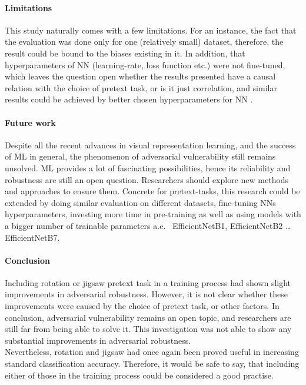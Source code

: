 \paragraph{Limitations}This study naturally comes with a few limitations.
For an instance, the fact that the evaluation was done only for one (relatively small) dataset,
therefore, the result could be bound to the biases existing in it.
In addition, that hyperparameters of NN (learning-rate, loss function etc.)
were not fine-tuned, which leaves the question open whether the
results presented have a causal relation with the choice of pretext task, or is it just correlation,
and similar results could be achieved by better chosen hyperparameters for NN .

\paragraph{Future work}
Despite all the recent advances in visual representation learning, and the success of ML in general, the phenomenon of
adversarial vulnerability still remains unsolved.
ML provides a lot of fascinating possibilities, hence its reliability and robustness are still an open question.
Researchers should explore new methods and approaches to ensure them.
Concrete for pretext-tasks, this research could be extended by doing similar evaluation on different datasets,
fine-tuning NNs hyperparameters,
investing more time in pre-training as well as using models with a bigger number of trainable parameters
a.e. \ EfficientNetB1, EfficientNetB2 \ldots EfficientNetB7.

\paragraph{Conclusion}
Including rotation or jigsaw pretext task in a training process had shown slight improvements in adversarial robustness.
However, it is not clear whether these improvements were caused by the choice of pretext task, or other factors.
In conclusion, adversarial vulnerability remains an open topic,
and researchers are still far from being able to solve it.
This investigation was not able to show any substantial improvements in adversarial robustness.
\\
Nevertheless, rotation and jigsaw had once again been proved useful in increasing standard classification accuracy.
Therefore, it would be safe to say,
that including either of those in the training process could be considered a good practise.


